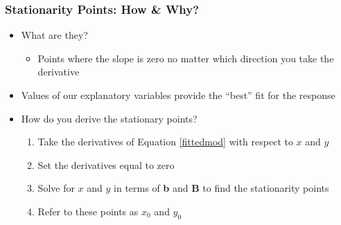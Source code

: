 \documentclass{beamer}\usepackage[]{graphicx}\usepackage[]{color}
\begin{document}

\begin{frame}
\frametitle{Stationarity Points: How \& Why?}
\begin{itemize}
  \item What are they?
  \begin{itemize}
    \item Points where the slope is zero no matter which direction you take the derivative
  \end{itemize}
  \item Values of our explanatory variables provide the ``best'' fit for the response \\
  \item How do you derive the stationary points?
  \begin{enumerate}
    \item Take the derivatives of Equation \ref{fittedmod} with respect to $x$ and $y$
    \item Set the derivatives equal to zero
    \item Solve for $x$ and $y$ in terms of {\bf b} and {\bf B} to find the stationarity points
    \item Refer to these points as $x_0$ and $y_0$
  \end{enumerate}
\end{itemize}
\end{frame}
\end{document}

